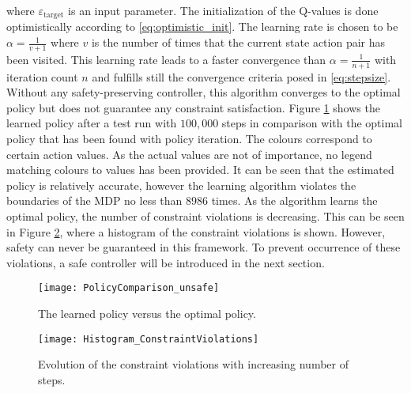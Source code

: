 \documentclass[../main.tex]{subfiles}
\begin{document}
where $\varepsilon_{\text{target}}$ is an input parameter.
The initialization of the Q-values is done optimistically according to \eqref{eq:optimistic_init}. The learning rate is chosen to be $\alpha = \frac{1}{v+1}$ where $v$ is the number of times that the current state action pair has been visited. This learning rate leads to a faster convergence than $\alpha = \frac{1}{n+1}$ with iteration count $n$ and fulfills still the convergence criteria posed in \eqref{eq:stepsize}. Without any safety-preserving controller, this algorithm converges to the optimal policy but does not guarantee any constraint satisfaction. Figure \ref{fig:PolicyComparison_unsafe} shows the learned policy after a test run with $100,000$ steps in comparison with the optimal policy that has been found with policy iteration. The colours correspond to certain action values. As the actual values are not of importance, no legend matching colours to values has been provided. It can be seen that the estimated policy is relatively accurate, however the learning algorithm violates the boundaries of the MDP no less than $8986$ times. As the algorithm learns the optimal policy, the number of constraint violations is decreasing. This can be seen in Figure \ref{fig:Histogram_ConstraintViolations}, where a histogram of the constraint violations is shown. However, safety can never be guaranteed in this framework. To prevent occurrence of these violations, a safe controller will be introduced in the next section.


\begin{figure}[H]
    \centering
    \texttt{[image: PolicyComparison\_unsafe]}
        \caption{The learned policy versus the optimal policy.}    
    \label{fig:PolicyComparison_unsafe}
\end{figure}
\begin{figure}[H]
    \centering
    \texttt{[image: Histogram\_ConstraintViolations]}
        \caption{Evolution of the constraint violations with increasing number of steps.}    
    \label{fig:Histogram_ConstraintViolations}
\end{figure}
\end{document}
